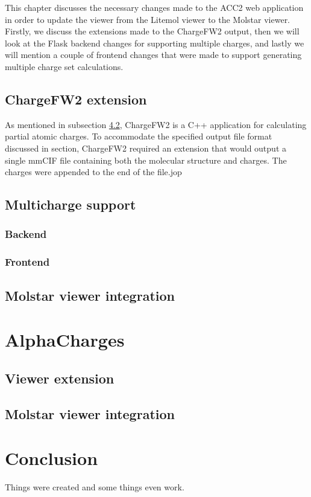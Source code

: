 \documentclass[
  digital,     %
  oneside,     %
  nosansbold,  %
  nocolorbold, %
  lof,         %
  lot,         %
]{fithesis4}
\begin{document}
This chapter discusses the necessary changes made to the ACC2 web application in order to update the viewer from the Litemol viewer to the Molstar viewer. Firstly, we discuss the extensions made to the ChargeFW2 output, then we will look at the Flask backend changes for supporting multiple charges, and lastly we will mention a couple of frontend changes that were made to support generating multiple charge set calculations.

\section{ChargeFW2 extension}
\label{section:chargefw2_extension}

As mentioned in subsection \ref{}, ChargeFW2 is a C++ application for calculating partial atomic charges.
To accommodate the specified output file format discussed in section, ChargeFW2 required an extension that would output a single mmCIF file containing both the molecular structure and charges. The charges were appended to the end of the file.jop

\section{Multicharge support}
\label{section:multicharge_support}

\subsection{Backend}

\subsection{Frontend}

\section{Molstar viewer integration}

\chapter{AlphaCharges}

\section{Viewer extension}

\section{Molstar viewer integration}

\chapter*{Conclusion}

Things were created and some things even work.
\end{document}
